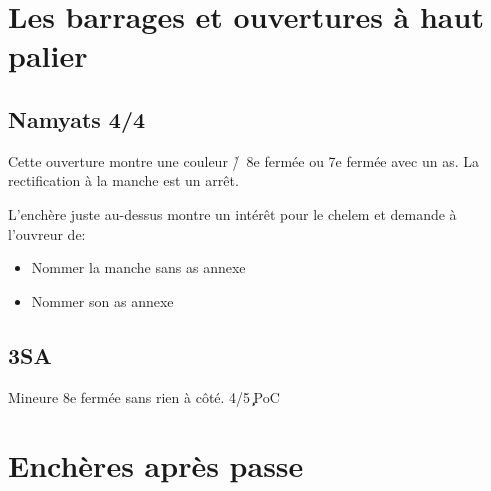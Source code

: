\documentclass[a4paper]{article}
\begin{document}
\section{Les barrages et ouvertures à haut palier}

\subsection{Namyats 4\pdfc/4\pdfd}

Cette ouverture montre une couleur \h /\s\ 8e fermée ou 7e fermée avec un as.
La rectification à la manche est un arrêt.

L'enchère juste au-dessus montre un intérêt pour le chelem et demande à l'ouvreur de:

\begin{itemize}
\item Nommer la manche sans as annexe

\item Nommer son as annexe

\end{itemize}

\subsection{3SA}

Mineure 8e fermée sans rien à côté. 
4/5\c \d\ PoC

\section{Enchères après passe}
\end{document}
